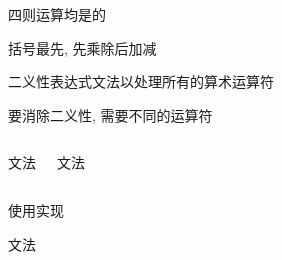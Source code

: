 \begin{frame}{}
  

  \vspace{0.30cm}
  \begin{center}
    四则运算均是的

    \vspace{0.30cm}
     括号最先, 先乘除后加减

    \vspace{0.80cm}
    二义性表达式文法以处理所有的算术运算符

    \vspace{0.30cm}
    要消除二义性, 需要不同的运算符

    \pause
    \vspace{0.80cm}
  \end{center}
\end{frame}

\begin{frame}{}
  

  \vspace{0.80cm}
  \begin{columns}
      \pause
      
      \begin{center}
        文法
      \end{center}
      \pause
      
      \begin{center}
        文法
      \end{center}
  \end{columns}

  \pause
  \vspace{0.80cm}
  \begin{center}
    使用实现
  \end{center}
\end{frame}

\begin{frame}{}
  

  \pause
  \vspace{0.80cm}
  

  \begin{center}
    文法
  \end{center}
\end{frame}

